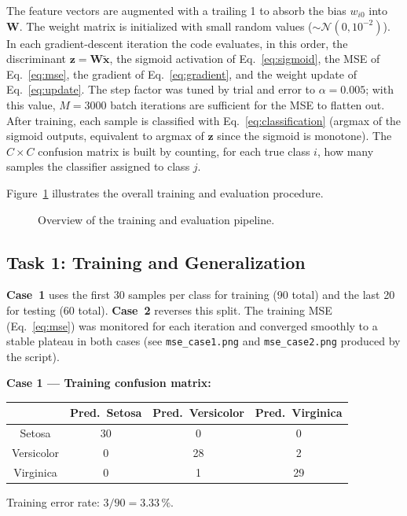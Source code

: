 \documentclass[11pt,a4paper]{article}
\begin{document}
The feature vectors are augmented with a trailing 1 to absorb the bias $w_{i0}$ into $\mathbf{W}$. The weight matrix is initialized with small random values ($\sim\!\mathcal{N}(0,10^{-2})$). In each gradient-descent iteration the code evaluates, in this order, the discriminant $\mathbf{z}=\mathbf{W}\tilde{\mathbf{x}}$, the sigmoid activation of Eq.~\eqref{eq:sigmoid}, the MSE of Eq.~\eqref{eq:mse}, the gradient of Eq.~\eqref{eq:gradient}, and the weight update of Eq.~\eqref{eq:update}. The step factor was tuned by trial and error to $\alpha = 0.005$; with this value, $M = 3000$ batch iterations are sufficient for the MSE to flatten out. After training, each sample is classified with Eq.~\eqref{eq:classification} (argmax of the sigmoid outputs, equivalent to argmax of $\mathbf{z}$ since the sigmoid is monotone). The $C \times C$ confusion matrix is built by counting, for each true class $i$, how many samples the classifier assigned to class $j$.

Figure~\ref{fig:flowchart} illustrates the overall training and evaluation procedure.

\begin{figure}[ht]
\centering
{}
\caption{Overview of the training and evaluation pipeline.}
\label{fig:flowchart}
\end{figure}

\subsection{Task 1: Training and Generalization}

\textbf{Case~1} uses the first 30 samples per class for training (90 total) and the last 20 for testing (60 total). \textbf{Case~2} reverses this split. The training MSE (Eq.~\eqref{eq:mse}) was monitored for each iteration and converged smoothly to a stable plateau in both cases (see \texttt{mse\_case1.png} and \texttt{mse\_case2.png} produced by the script).

\bigskip
\noindent\textbf{Case 1 --- Training confusion matrix:}
\begin{center}
\begin{tabular}{c|ccc}
\toprule
 & Pred.\ Setosa & Pred.\ Versicolor & Pred.\ Virginica \\
\midrule
Setosa     & 30 & 0  & 0  \\
Versicolor & 0  & 28 & 2  \\
Virginica  & 0  & 1  & 29 \\
\bottomrule
\end{tabular}
\end{center}
Training error rate: $3/90 = 3.33\,\%$.
\end{document}
